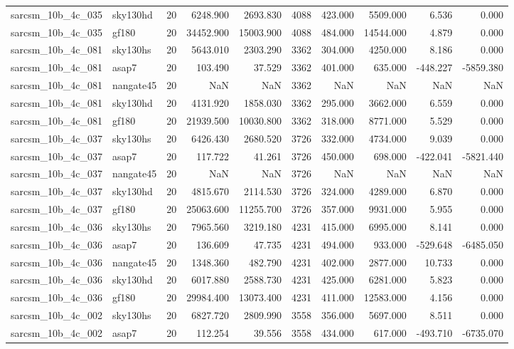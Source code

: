 \begin{tabular}{llrrrrrrrr}
sarcsm\_10b\_4c\_035 & sky130hd & 20 & 6248.900 & 2693.830 & 4088 & 423.000 & 5509.000 & 6.536 & 0.000 \\
sarcsm\_10b\_4c\_035 & gf180 & 20 & 34452.900 & 15003.900 & 4088 & 484.000 & 14544.000 & 4.879 & 0.000 \\
sarcsm\_10b\_4c\_081 & sky130hs & 20 & 5643.010 & 2303.290 & 3362 & 304.000 & 4250.000 & 8.186 & 0.000 \\
sarcsm\_10b\_4c\_081 & asap7 & 20 & 103.490 & 37.529 & 3362 & 401.000 & 635.000 & -448.227 & -5859.380 \\
sarcsm\_10b\_4c\_081 & nangate45 & 20 & NaN & NaN & 3362 & NaN & NaN & NaN & NaN \\
sarcsm\_10b\_4c\_081 & sky130hd & 20 & 4131.920 & 1858.030 & 3362 & 295.000 & 3662.000 & 6.559 & 0.000 \\
sarcsm\_10b\_4c\_081 & gf180 & 20 & 21939.500 & 10030.800 & 3362 & 318.000 & 8771.000 & 5.529 & 0.000 \\
sarcsm\_10b\_4c\_037 & sky130hs & 20 & 6426.430 & 2680.520 & 3726 & 332.000 & 4734.000 & 9.039 & 0.000 \\
sarcsm\_10b\_4c\_037 & asap7 & 20 & 117.722 & 41.261 & 3726 & 450.000 & 698.000 & -422.041 & -5821.440 \\
sarcsm\_10b\_4c\_037 & nangate45 & 20 & NaN & NaN & 3726 & NaN & NaN & NaN & NaN \\
sarcsm\_10b\_4c\_037 & sky130hd & 20 & 4815.670 & 2114.530 & 3726 & 324.000 & 4289.000 & 6.870 & 0.000 \\
sarcsm\_10b\_4c\_037 & gf180 & 20 & 25063.600 & 11255.700 & 3726 & 357.000 & 9931.000 & 5.955 & 0.000 \\
sarcsm\_10b\_4c\_036 & sky130hs & 20 & 7965.560 & 3219.180 & 4231 & 415.000 & 6995.000 & 8.141 & 0.000 \\
sarcsm\_10b\_4c\_036 & asap7 & 20 & 136.609 & 47.735 & 4231 & 494.000 & 933.000 & -529.648 & -6485.050 \\
sarcsm\_10b\_4c\_036 & nangate45 & 20 & 1348.360 & 482.790 & 4231 & 402.000 & 2877.000 & 10.733 & 0.000 \\
sarcsm\_10b\_4c\_036 & sky130hd & 20 & 6017.880 & 2588.730 & 4231 & 425.000 & 6281.000 & 5.823 & 0.000 \\
sarcsm\_10b\_4c\_036 & gf180 & 20 & 29984.400 & 13073.400 & 4231 & 411.000 & 12583.000 & 4.156 & 0.000 \\
sarcsm\_10b\_4c\_002 & sky130hs & 20 & 6827.720 & 2809.990 & 3558 & 356.000 & 5697.000 & 8.511 & 0.000 \\
sarcsm\_10b\_4c\_002 & asap7 & 20 & 112.254 & 39.556 & 3558 & 434.000 & 617.000 & -493.710 & -6735.070 \\

\end{tabular}
